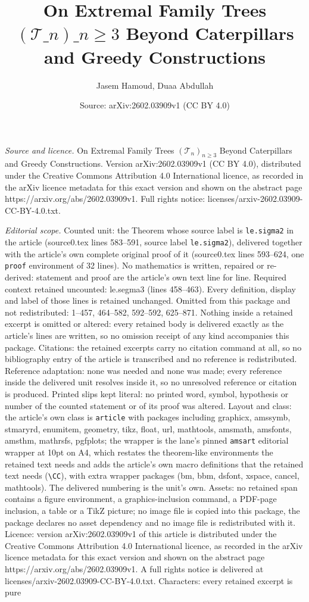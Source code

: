 \documentclass[10pt,a4paper]{amsart}
\title[On Extremal Family Trees $(\mathcal{T}\_n)\_{n\geqslant 3}$ Be]{On Extremal Family Trees $(\mathcal{T}\_n)\_{n\geqslant 3}$ Beyond Caterpillars and Greedy Constructions}
\author{Jasem Hamoud, Duaa Abdullah}
\date{Source: arXiv:2602.03909v1 (CC BY 4.0)}
\begin{document}
\maketitle

\noindent\emph{Source and licence.} On Extremal Family Trees $(\mathcal{T}_n)_{n\geqslant 3}$ Beyond Caterpillars and Greedy Constructions. Version arXiv:2602.03909v1 (CC BY 4.0), distributed under the Creative Commons Attribution 4.0 International licence, as recorded in the arXiv licence metadata for this exact version and shown on the abstract page https://arxiv.org/abs/2602.03909v1. Full rights notice: licenses/arxiv-2602.03909-CC-BY-4.0.txt.\par\smallskip

\noindent\textit{Editorial scope.} Counted unit: the Theorem whose source label is \texttt{le.sigma2} in the article (source0.tex lines 583--591, source label \texttt{le.sigma2}), delivered together with the article's own complete original proof of it (source0.tex lines 593--624, one \texttt{proof} environment of 32 lines). No mathematics is written, repaired or re-derived: statement and proof are the article's own text line for line. Required context retained uncounted: le.segma3 (lines 458--463). Every definition, display and label of those lines is retained unchanged. Omitted from this package and not redistributed: 1--457, 464--582, 592--592, 625--871. Nothing inside a retained excerpt is omitted or altered: every retained body is delivered exactly as the article's lines are written, so no omission receipt of any kind accompanies this package. Citations: the retained excerpts carry no citation command at all, so no bibliography entry of the article is transcribed and no reference is redistributed. Reference adaptation: none was needed and none was made; every reference inside the delivered unit resolves inside it, so no unresolved reference or citation is produced. Printed slips kept literal: no printed word, symbol, hypothesis or number of the counted statement or of its proof was altered. Layout and class: the article's own class is \texttt{article} with packages including graphicx, amssymb, stmaryrd, enumitem, geometry, tikz, float, url, mathtools, amsmath, amsfonts, amsthm, mathrsfs, pgfplots; the wrapper is the lane's pinned \texttt{amsart} editorial wrapper at 10pt on A4, which restates the theorem-like environments the retained text needs and adds the article's own macro definitions that the retained text needs (\texttt{\textbackslash CC}), with extra wrapper packages (bm, bbm, dsfont, xspace, cancel, mathtools). The delivered numbering is the unit's own. Assets: no retained span contains a figure environment, a graphics-inclusion command, a PDF-page inclusion, a table or a TikZ picture; no image file is copied into this package, the package declares no asset dependency and no image file is redistributed with it. Licence: version arXiv:2602.03909v1 of this article is distributed under the Creative Commons Attribution 4.0 International licence, as recorded in the arXiv licence metadata for this exact version and shown on the abstract page https://arxiv.org/abs/2602.03909v1. A full rights notice is delivered at licenses/arxiv-2602.03909-CC-BY-4.0.txt. Characters: every retained excerpt is pure 
\end{document}
